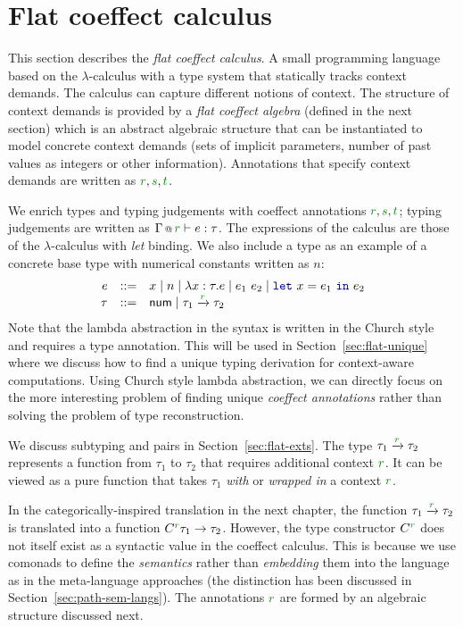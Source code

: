 \section{Flat coeffect calculus}
\label{sec:flat-calculus}

This section describes the \emph{flat coeffect calculus}. A small programming language based on the
$\lambda$-calculus with a type system that statically tracks context demands. The calculus can
capture different notions of context. The structure of context demands is provided by a
\emph{flat coeffect algebra} (defined in the next section) which is an abstract algebraic structure
that can be instantiated to model concrete context demands (sets of implicit parameters, number
of past values as integers or other information). Annotations that specify context demands are
written as $\cclrd{r}, \cclrd{s}, \cclrd{t}$.

We enrich types and typing judgements with coeffect annotations $\cclrd{r}, \cclrd{s}, \cclrd{t}$;
typing judgements are written as $\coctx{\Gamma}{\cclrd{r}}\vdash e:\tau$. The expressions of
the calculus are those of the $\lambda$-calculus with \emph{let} binding. We also include a type
 as an example of a concrete base type with numerical constants written as $n$:
%
\begin{equation*}
\begin{array}{rcl}
e &::=& x \sep n \sep \lambda x:\tau.e \sep e_1~e_2 \sep \kvd{let}~x = e_1~\kvd{in}~e_2\\
\tau &::=& \ident{num} \sep \tau_1 \xrightarrow{\cclrd{r}} \tau_2
\end{array}
\end{equation*}
%
Note that the lambda abstraction in the syntax is written in the Church style and requires a type
annotation. This will be used in Section~\ref{sec:flat-unique} where we discuss how to find a
unique typing derivation for context-aware computations. Using Church style lambda abstraction,
we can directly focus on the more interesting problem of finding unique \emph{coeffect annotations}
rather than solving the problem of type reconstruction.

We discuss subtyping and pairs in Section~\ref{sec:flat-exts}. The type $\tau_1 \xrightarrow{\cclrd{r}} \tau_2$
represents a function from $\tau_1$ to $\tau_2$ that requires additional context $\cclrd{r}$.
It can be viewed as a pure function that takes $\tau_1$ \emph{with} or \emph{wrapped in} a
context $\cclrd{r}$.

In the categorically-inspired translation in the next chapter, the function
$\tau_1 \xrightarrow{\cclrd{r}} \tau_2$ is translated into a function
$C^{\cclrd{r}} \tau_1 \rightarrow \tau_2$. However, the type constructor $C^{\cclrd{r}}$
does not itself exist as a syntactic value in the coeffect calculus. This is because we use
comonads to define the \emph{semantics} rather than \emph{embedding} them into the language as in
the meta-language approaches (the distinction has been discussed in Section~\ref{sec:path-sem-langs}).
The annotations $\cclrd{r}$ are formed by an algebraic structure discussed next.

